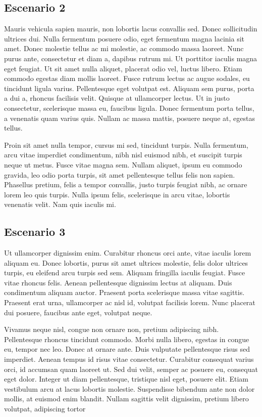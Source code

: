 \documentclass[a4paper, 10pt, twoside]{article}
\begin{document}
\subsection{Escenario 2}

Mauris vehicula sapien mauris, non lobortis lacus convallis sed. Donec sollicitudin ultrices dui. Nulla fermentum posuere odio, eget fermentum magna lacinia sit amet. Donec molestie tellus ac mi molestie, ac commodo massa laoreet. Nunc purus ante, consectetur et diam a, dapibus rutrum mi. Ut porttitor iaculis magna eget feugiat. Ut sit amet nulla aliquet, placerat odio vel, luctus libero. Etiam commodo egestas diam mollis laoreet. Fusce rutrum lectus ac augue sodales, eu tincidunt ligula varius. Pellentesque eget volutpat est. Aliquam sem purus, porta a dui a, rhoncus facilisis velit. Quisque at ullamcorper lectus. Ut in justo consectetur, scelerisque massa eu, faucibus ligula. Donec fermentum porta tellus, a venenatis quam varius quis. Nullam ac massa mattis, posuere neque at, egestas tellus.

Proin sit amet nulla tempor, cursus mi sed, tincidunt turpis. Nulla fermentum, arcu vitae imperdiet condimentum, nibh nisl euismod nibh, et suscipit turpis neque ut metus. Fusce vitae magna sem. Nullam aliquet, ipsum eu commodo gravida, leo odio porta turpis, sit amet pellentesque tellus felis non sapien. Phasellus pretium, felis a tempor convallis, justo turpis feugiat nibh, ac ornare lorem leo quis turpis. Nulla ipsum felis, scelerisque in arcu vitae, lobortis venenatis velit. Nam quis iaculis mi.


\subsection{Escenario 3}

Ut ullamcorper dignissim enim. Curabitur rhoncus orci ante, vitae iaculis lorem aliquam eu. Donec lobortis, purus sit amet ultrices molestie, felis dolor ultrices turpis, eu eleifend arcu turpis sed sem. Aliquam fringilla iaculis feugiat. Fusce vitae rhoncus felis. Aenean pellentesque dignissim lectus at aliquam. Duis condimentum aliquam auctor. Praesent porta scelerisque massa vitae sagittis. Praesent erat urna, ullamcorper ac nisl id, volutpat facilisis lorem. Nunc placerat dui posuere, faucibus ante eget, volutpat neque.

Vivamus neque nisl, congue non ornare non, pretium adipiscing nibh. Pellentesque rhoncus tincidunt commodo. Morbi nulla libero, egestas in congue eu, tempor nec leo. Donec at ornare ante. Duis vulputate pellentesque risus sed imperdiet. Aenean tempus id risus vitae consectetur. Curabitur consequat varius orci, id accumsan quam laoreet ut. Sed dui velit, semper ac posuere eu, consequat eget dolor. Integer ut diam pellentesque, tristique nisl eget, posuere elit. Etiam vestibulum arcu at lacus lobortis molestie. Suspendisse bibendum ante non dolor mollis, at euismod enim blandit. Nullam sagittis velit dignissim, pretium libero volutpat, adipiscing tortor
\end{document}
